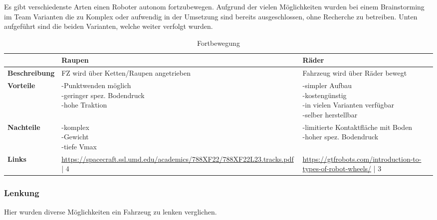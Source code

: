 Es gibt verschiedenste Arten einen Roboter autonom fortzubewegen. Aufgrund der vielen Möglichkeiten wurden bei einem Brainstorming im Team Varianten die zu Komplex oder aufwendig in der Umsetzung sind bereits ausgeschlossen, ohne Recherche zu betreiben. Unten aufgeführt sind die beiden Varianten, welche weiter verfolgt wurden.

\begin{table}[H]
\centering
\small
\begin{tabularx}{\textwidth}{|l|X|X|}
\hline
\textbf{} & \textbf{Raupen} & \textbf{Räder} \\
  \hline
  \textbf{Beschreibung}  & FZ wird über Ketten/Raupen angetrieben & Fahrzeug wird über Räder bewegt \\
  \hline
  \textbf{Vorteile}  & \makecell{-Punktwenden möglich\\-geringer spez. Bodendruck\\-hohe Traktion} & \makecell{-simpler Aufbau\\-kostengünstig\\-in vielen Varianten verfügbar\\-selber herstellbar}  \\
  \hline
  \textbf{Nachteile} & \makecell{-komplex\\-Gewicht\\-tiefe Vmax} & \makecell{-limitierte Kontaktfläche mit Boden\\-hoher spez. Bodendruck} \\
  \hline
  \textbf{Links} & \url{https://spacecraft.ssl.umd.edu/academics/788XF22/788XF22L23.tracks.pdf} | 4 & \url{https://gtfrobots.com/introduction-to-types-of-robot-wheels/} | 3\\
  \hline
\end{tabularx}
\caption{Fortbewegung}
\label{table:drive}
\end{table}



\subsubsection{Lenkung}

Hier wurden diverse Möglichkeiten ein Fahrzeug zu lenken verglichen. 

